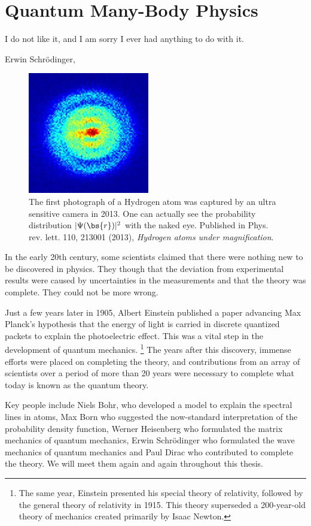 \chapter{Quantum Many-Body Physics} \label{chp:quantum}
\epigraph{I do not like it, and I am sorry I ever had anything to do with it.}{Erwin Schrödinger,\cite{noauthor_quantum_2005}}
\begin{figure}[H]
	\centering
	\captionsetup[subfigure]{labelformat=empty}
	\includegraphics[scale=3.0]{Images/art_quantum.jpg}
	\caption{The first photograph of a Hydrogen atom was captured by an ultra sensitive camera in 2013. One can actually see the probability distribution $|\Psi(\bs{r})|^2$ with the naked eye. Published in Phys. rev. lett. 110, 213001 (2013), \textit{Hydrogen atoms under magnification}. \cite{stodolna_hydrogen_2013}}
\end{figure}

In the early 20th century, some scientists claimed that there were nothing new to be discovered in physics. They though that the deviation from experimental results were caused by uncertainties in the measurements and that the theory was complete. \cite{weisstein_kelvin_2007} They could not be more wrong.

Just a few years later in 1905, Albert Einstein published a paper advancing Max Planck's hypothesis that the energy of light is carried in discrete quantized packets to explain the photoelectric effect. This was a vital step in the development of quantum mechanics. \footnote{The same year, Einstein presented his special theory of relativity, followed by the general theory of relativity in 1915. This theory superseded a 200-year-old theory of mechanics created primarily by Isaac Newton.} The years after this discovery, immense efforts were placed on completing the theory, and contributions from an array of scientists over a period of more than 20 years were necessary to complete what today is known as the quantum theory. 

Key people include Niels Bohr, who developed a model to explain the spectral lines in atoms, Max Born who suggested the now-standard interpretation of the probability density function, Werner Heisenberg who formulated the matrix mechanics of quantum mechanics, Erwin Schrödinger who formulated the wave mechanics of quantum mechanics and Paul Dirac who contributed to complete the theory. We will meet them again and again throughout this thesis.

